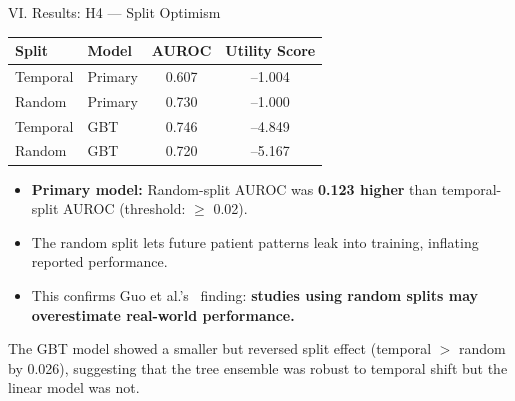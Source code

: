 \begin{frame}{VI. Results: H4 --- Split Optimism \confirmed}
\begin{center}\tablestyle\footnotesize
\begin{tabular}{llcc}
\toprule
\textbf{Split} & \textbf{Model} & \textbf{AUROC} & \textbf{Utility Score} \\
\midrule
Temporal & Primary & 0.607 & --1.004 \\
Random   & Primary & 0.730 & --1.000 \\
Temporal & GBT     & 0.746 & --4.849 \\
Random   & GBT     & 0.720 & --5.167 \\
\bottomrule
\end{tabular}
\end{center}

\vspace{4pt}
\begin{itemize}\itemsep1pt\small
  \item \textbf{Primary model:} Random-split AUROC was \textbf{0.123 higher}
        than temporal-split AUROC (threshold: $\geq$ 0.02).
  \item The random split lets future patient patterns leak into training,
        inflating reported performance.
  \item This confirms Guo et al.'s~\cite{guo2022temporal} finding:
        \textbf{studies using random splits may overestimate real-world
        performance.}
\end{itemize}

\vspace{2pt}
\begin{block}{}
  \footnotesize The GBT model showed a smaller but reversed split effect
  (temporal $>$ random by 0.026), suggesting that the tree ensemble was
  robust to temporal shift but the linear model was not.
\end{block}
\end{frame}


